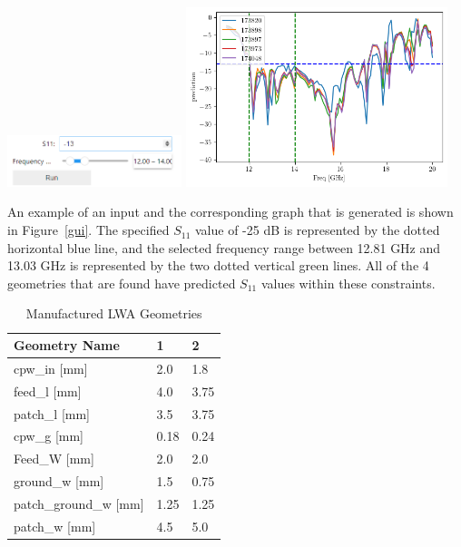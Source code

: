 \documentclass[conference]{IEEEtran}
\newenvironment{Figure}
    {\par\medskip\noindent\minipage{\linewidth}}
    {\endminipage\par\medskip}
\begin{document}
\begin{Figure}
    \centering
    \includegraphics[width=2in]{gui_input}
    \includegraphics[width=3in]{gui_graph}
    \label{gui}
\end{Figure}

An example of an input and the corresponding graph that is generated is shown in Figure~\ref{gui}. The specified $S_{11}$ value of -25 dB is represented by the dotted horizontal blue line, and the selected frequency range between 12.81 GHz and 13.03 GHz is represented by the two dotted vertical green lines. All of the 4 geometries that are found have predicted $S_{11}$ values within these constraints. 

\begin{table}[h]
\caption{Manufactured LWA Geometries}
\begin{center}
\begin{tabular}{ 
|l|l|l|}
    \hline
    Geometry Name & 1 & 2 \\
    \hline
    cpw\_in [mm] & 2.0 & 1.8 \\
    \hline
    feed\_l [mm] & 4.0 & 3.75 \\
    \hline
    patch\_l [mm] & 3.5 & 3.75 \\
    \hline
    cpw\_g [mm] & 0.18 & 0.24 \\
    \hline
    Feed\_W [mm] & 2.0 & 2.0 \\
    \hline
    ground\_w [mm] & 1.5 & 0.75 \\
    \hline
    patch\_ground\_w [mm] & 1.25 & 1.25 \\
    \hline
    patch\_w [mm] & 4.5 & 5.0 \\
    \hline
\end{tabular}
\end{center}
\label{manufactured_geometries_list}
\end{table}
\end{document}
